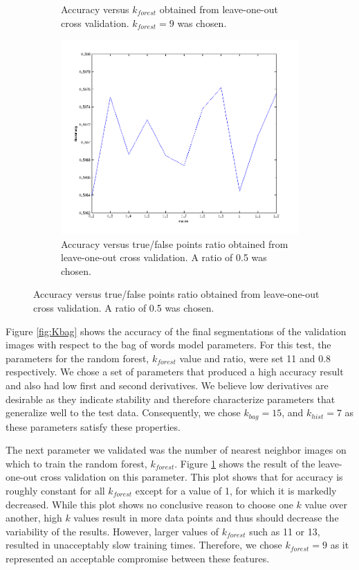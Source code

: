 \documentclass{article} %
\begin{document}
\begin{figure}[htb]
\begin{subfigure}[t]{0.33\textwidth}
		\parbox{0.95\textwidth}{\caption{Accuracy versus $k_{forest}$ obtained from leave-one-out cross validation. $k_{forest} = 9$ was chosen. \label{fig:Kforest}}}
	\end{subfigure}
	\begin{subfigure}[t]{0.33\textwidth}
		\centering
		\includegraphics[width = \textwidth]{./img/ratio}
		\parbox{0.95\textwidth}{\caption{Accuracy versus true/false points ratio obtained from leave-one-out cross validation. A ratio  of 0.5 was chosen. \label{fig:ratio}}}
	\end{subfigure}
\end{figure}

Figure \ref{fig:Kbag} shows the accuracy of the final segmentations of the validation images with respect to the bag of words model parameters. For this test, the parameters for the random forest, $k_{forest}$ value and ratio, were set 11 and 0.8 respectively. We chose a set of parameters that produced a high accuracy result and also had low first and second derivatives. We believe low derivatives are desirable as they indicate stability and therefore characterize parameters that generalize well to the test data. Consequently, we chose $k_{bag} = 15$, and $k_{hist} = 7$ as these parameters satisfy these properties.

The next parameter we validated was the number of nearest neighbor images on which to train the random forest, $k_{forest}$. Figure \ref{fig:Kforest} shows the result of the leave-one-out cross validation on this parameter. This plot shows that for accuracy is roughly constant for all $k_{forest}$ except for a value of 1, for which it is markedly decreased. While this plot shows no conclusive reason to choose one $k$ value over another, high $k$ values result in more data points and thus should decrease the variability of the results. However, larger values of $k_{forest}$ such as 11 or 13, resulted in unacceptably slow training times. Therefore, we chose $k_{forest} = 9$ as it represented an acceptable compromise between these features.
\end{document}
